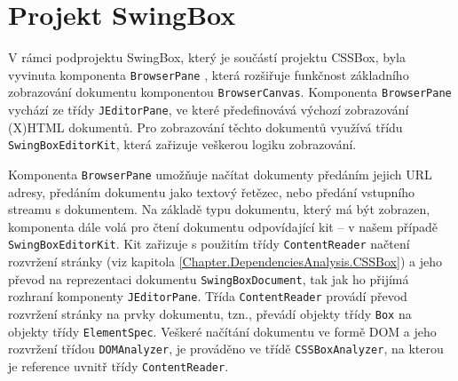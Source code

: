 \clearpage

\section{Projekt SwingBox}
\label{Chapter.DependenciesAnalysis.SwingBox}

V rámci podprojektu SwingBox, který je součástí projektu CSSBox, byla vyvinuta komponenta \texttt{BrowserPane} \cite{Bibliography.SwingBox.Thesis}, která rozšiřuje funkčnost základního zobrazování dokumentu komponentou \texttt{BrowserCanvas}. Komponenta \texttt{BrowserPane} vychází ze třídy \texttt{JEditorPane}, ve které předefinovává výchozí zobrazování (X)HTML dokumentů. Pro zobrazování těchto dokumentů využívá třídu \texttt{SwingBoxEditorKit}, která zařizuje veškerou logiku zobrazování.

Komponenta \texttt{BrowserPane} umožňuje načítat dokumenty předáním jejich URL adresy, předáním dokumentu jako textový řetězec, nebo předání vstupního streamu s dokumentem. Na základě typu dokumentu, který má být zobrazen, komponenta dále volá pro čtení dokumentu odpovídající kit -- v našem případě \texttt{SwingBoxEditorKit}. Kit zařizuje s použitím třídy \texttt{ContentReader} načtení rozvržení stránky (viz kapitola \ref{Chapter.DependenciesAnalysis.CSSBox}) a jeho převod na reprezentaci dokumentu \texttt{SwingBoxDocument}, tak jak ho přijímá rozhraní komponenty \texttt{JEditorPane}. Třída \texttt{ContentReader} provádí převod rozvržení stránky na prvky dokumentu, tzn., převádí objekty třídy \texttt{Box} na objekty třídy \texttt{ElementSpec}. Veškeré načítání dokumentu ve formě DOM a jeho rozvržení třídou \texttt{DOMAnalyzer}, je prováděno ve třídě \texttt{CSSBoxAnalyzer}, na kterou je reference uvnitř třídy \texttt{ContentReader}.

